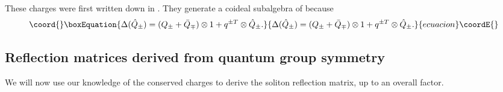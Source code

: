 \documentclass[a4paper,12pt]{article}
\providecommand{\uqgh}{U_q(\hat{g})}
\numberwithin{equation}{section}
\begin{document}
These charges were first written down in \cite{Mez98}. They
generate a coideal subalgebra of \myHighlight{$\uqgh$}\coordHE{} because
\begin{equation}\coord{}\boxEquation{
  \Delta(\hat{Q}_\pm)=(Q_\pm+\bar{Q}_\mp)\otimes 1+q^{\pm
  T}\otimes\hat{Q}_\pm.
}{
  \Delta(\hat{Q}_\pm)=(Q_\pm+\bar{Q}_\mp)\otimes 1+q^{\pm
  T}\otimes\hat{Q}_\pm.
}{ecuacion}\coordE{}\end{equation}




\subsection{Reflection matrices derived from quantum group
symmetry\label{sectrmdqgs}}

We will now use our knowledge of the conserved charges
\coordHE{} to derive the soliton reflection matrix, up to an
overall factor.
\end{document}
